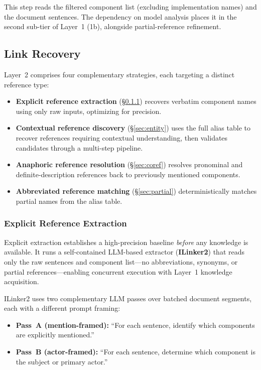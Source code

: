 This step reads the filtered component list (excluding
implementation names) and the document sentences.
The dependency on model analysis places it in the second sub-tier
of Layer~1 (1b), alongside partial-reference refinement.


\subsection{Link Recovery}\label{sec:recovery}

Layer~2 comprises four complementary strategies, each targeting a
distinct reference type:

\begin{itemize}
    \item \textbf{Explicit reference extraction} (\S\ref{sec:seed})
      recovers verbatim component names using only raw inputs,
      optimizing for precision.
    \item \textbf{Contextual reference discovery} (\S\ref{sec:entity})
      uses the full alias table to recover references requiring
      contextual understanding, then validates candidates through
      a multi-step pipeline.
    \item \textbf{Anaphoric reference resolution} (\S\ref{sec:coref})
      resolves pronominal and definite-description references
      back to previously mentioned components.
    \item \textbf{Abbreviated reference matching} (\S\ref{sec:partial})
      deterministically matches partial names from the alias table.
\end{itemize}

\subsubsection{Explicit Reference Extraction}\label{sec:seed}

Explicit extraction establishes a high-precision baseline
\emph{before} any knowledge is available.
It runs a self-contained LLM-based extractor (\textbf{ILinker2})
that reads only the raw sentences and component list---no
abbreviations, synonyms, or partial references---enabling concurrent
execution with Layer~1 knowledge acquisition.

ILinker2 uses two complementary LLM passes over batched document
segments, each with a different prompt framing:

\begin{itemize}
    \item \textbf{Pass~A (mention-framed):} ``For each sentence,
      identify which components are explicitly mentioned.''
    \item \textbf{Pass~B (actor-framed):} ``For each sentence,
      determine which component is the subject or primary actor.''
\end{itemize}

